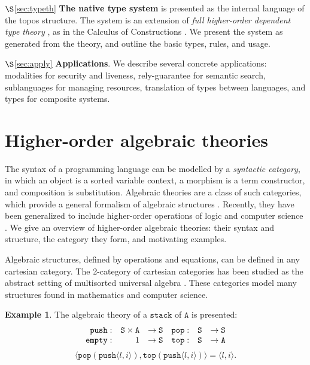 \documentclass[conference]{IEEEtran}
\theoremstyle{definition}
\newtheorem{example}[theorem]{Example}
\newcommand{\mrm}[1]{\mathrm{#1}}
\newcommand{\mtt}[1]{\mathtt{#1}}
\newcommand{\Set}{\mrm{Set}}
\newcommand{\tts}{\mtt{S}}
\begin{document}
$\S$\ref{sec:typeth} \textbf{The native type system} is presented as the internal language of the topos structure. The system is an extension of \textit{full higher-order dependent type theory} \cite{jacobs}, as in the Calculus of Constructions \cite{coc}. We present the system as generated from the theory, and outline the basic types, rules, and usage.

$\S$\ref{sec:apply} \textbf{Applications}. We describe several concrete applications: modalities for security and liveness, rely-guarantee for semantic search, sublanguages for managing resources, translation of types between languages, and types for composite systems.



\section{Higher-order algebraic theories}
\label{algthy}

The syntax of a programming language can be modelled by a \textit{syntactic category}, in which an object is a sorted variable context, a morphism is a term constructor, and composition is substitution. Algebraic theories are a class of such categories, which provide a general formalism of algebraic structures \cite{algthys}. Recently, they have been generalized to include higher-order operations of logic and computer science \cite{hoat}. We give an overview of higher-order algebraic theories: their syntax and structure, the category they form, and motivating examples.


Algebraic structures, defined by operations and equations, can be defined in any cartesian category. The 2-category of cartesian categories has been studied as the abstract setting of multisorted universal algebra \cite{algthys}. These categories model many structures found in mathematics and computer science.

\begin{example}
The algebraic theory of a $\mtt{stack}$ of $\mtt{A}$ is presented:
\[\begin{array}{rrl@{\quad}rrl}
    \mtt{push}: & \tts\times \mtt{A} &\to \tts & \mtt{pop}: & \tts & \to \tts\\
    \mtt{empty}: & 1 & \to \tts & \mtt{top}: & \tts & \to \mtt{A}
\end{array}\]
\[\langle\mtt{pop}(\mtt{push}\langle l,i\rangle),\mtt{top}(\mtt{push}\langle l,i\rangle) \rangle = \langle l,i\rangle.\]
\end{example}
\end{document}
